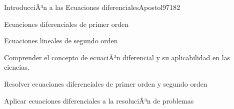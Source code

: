 \begin{syllabus}
\begin{unit}{IntroducciÃ³n a las Ecuaciones diferenciales}{Apostol97}{18}{2}
   \begin{topics}
      \item Ecuaciones diferenciales de primer orden
      \item Ecuaciones lineales de segundo orden
   \end{topics}

   \begin{learningoutcomes}
      \item Comprender el concepto de ecuaciÃ³n diferencial y su aplicabilidad en las ciencias.
      \item Resolver ecuaciones diferenciales de primer orden y segundo orden
      \item Aplicar ecuaciones diferenciales a la resoluciÃ³n de problemas
      \end{learningoutcomes}
\end{unit}



\begin{coursebibliography}
\end{coursebibliography}

\end{syllabus}
